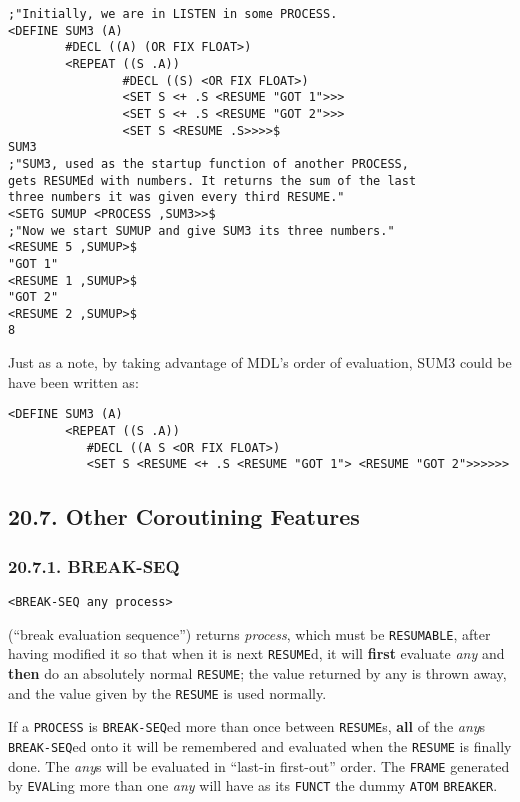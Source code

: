 \documentclass[a4paper,]{article}
\begin{document}

\begin{verbatim}
;"Initially, we are in LISTEN in some PROCESS.
<DEFINE SUM3 (A)
        #DECL ((A) (OR FIX FLOAT>)
        <REPEAT ((S .A))
                #DECL ((S) <OR FIX FLOAT>)
                <SET S <+ .S <RESUME "GOT 1">>>
                <SET S <+ .S <RESUME "GOT 2">>>
                <SET S <RESUME .S>>>>$
SUM3
;"SUM3, used as the startup function of another PROCESS,
gets RESUMEd with numbers. It returns the sum of the last
three numbers it was given every third RESUME."
<SETG SUMUP <PROCESS ,SUM3>>$
;"Now we start SUMUP and give SUM3 its three numbers."
<RESUME 5 ,SUMUP>$
"GOT 1"
<RESUME 1 ,SUMUP>$
"GOT 2"
<RESUME 2 ,SUMUP>$
8
\end{verbatim}

Just as a note, by taking advantage of MDL's order of evaluation, SUM3 could be have been written as:

\begin{verbatim}
<DEFINE SUM3 (A)
        <REPEAT ((S .A))
           #DECL ((A S <OR FIX FLOAT>)
           <SET S <RESUME <+ .S <RESUME "GOT 1"> <RESUME "GOT 2">>>>>>
\end{verbatim}

\subsection{20.7. Other Coroutining Features}\label{other-coroutining-features}

\subsubsection{20.7.1. BREAK-SEQ}\label{break-seq}

\begin{verbatim}
<BREAK-SEQ any process>
\end{verbatim}

 (``break evaluation sequence'') returns \emph{process}, which must be \texttt{RESUMABLE},
after having modified it so that when it is next \texttt{RESUME}d, it will \textbf{first} evaluate
\emph{any} and \textbf{then} do an absolutely normal \texttt{RESUME}; the value returned by any is thrown away, and the
value given by the \texttt{RESUME} is used normally.

If a \texttt{PROCESS} is \texttt{BREAK-SEQ}ed more than once between \texttt{RESUME}s, \textbf{all} of the \emph{any}s
\texttt{BREAK-SEQ}ed onto it will be remembered and evaluated when the \texttt{RESUME} is finally done. The \emph{any}s
will be evaluated in ``last-in first-out'' order. The \texttt{FRAME} generated by \texttt{EVAL}ing more than one \emph{any}
will have as its \texttt{FUNCT} the dummy \texttt{ATOM} \texttt{BREAKER}.
\end{document}
